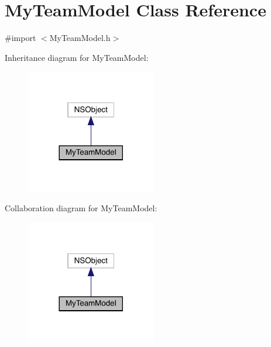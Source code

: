 \hypertarget{interface_my_team_model}{}\section{My\+Team\+Model Class Reference}
\label{interface_my_team_model}


{\ttfamily \#import $<$My\+Team\+Model.\+h$>$}



Inheritance diagram for My\+Team\+Model\+:\nopagebreak
\begin{figure}[H]
\begin{center}
\leavevmode
\includegraphics[width=161pt]{interface_my_team_model__inherit__graph}
\end{center}
\end{figure}


Collaboration diagram for My\+Team\+Model\+:\nopagebreak
\begin{figure}[H]
\begin{center}
\leavevmode
\includegraphics[width=161pt]{interface_my_team_model__coll__graph}
\end{center}
\end{figure}
